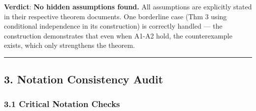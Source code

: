 \documentclass[
  12pt,
]{article}
\begin{document}
\textbf{Verdict}: \textbf{No hidden assumptions found.} All assumptions
are explicitly stated in their respective theorem documents. One
borderline case (Thm 3 using conditional independence in its
construction) is correctly handled --- the construction demonstrates
that even when A1-A2 hold, the counterexample exists, which only
strengthens the theorem.

\begin{center}\rule{0.5\linewidth}{0.5pt}\end{center}

\subsection{3. Notation Consistency
Audit}\label{notation-consistency-audit}

\subsubsection{3.1 Critical Notation
Checks}\label{critical-notation-checks}
\end{document}
